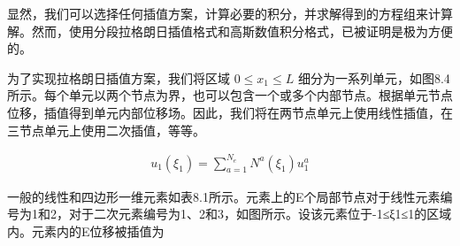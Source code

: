 \documentclass[12pt,a4paper]{book}
\begin{document}
显然，我们可以选择任何插值方案，计算必要的积分，并求解得到的方程组来计算解。然而，使用分段拉格朗日插值格式和高斯数值积分格式，已被证明是极为方便的。








为了实现拉格朗日插值方案，我们将区域 $ 0 \leq  x_1 \leq L $ 细分为一系列单元，如图8.4所示。每个单元以两个节点为界，也可以包含一个或多个内部节点。根据单元节点位移，插值得到单元内部位移场。因此，我们将在两节点单元上使用线性插值，在三节点单元上使用二次插值，等等。

\begin{equation*}
    \begin{aligned}
        u_{1}\left(\xi_{1}\right)=\sum_{a=1}^{N_{e}} N^{a}\left(\xi_{1}\right) u_{1}^{a}
    \end{aligned}
\end{equation*}


一般的线性和四边形一维元素如表8.1所示。元素上的E个局部节点对于线性元素编号为1和2，对于二次元素编号为1、2和3，如图所示。设该元素位于-1≤ξ1≤1的区域内。元素内的E位移被插值为


% 







\end{document}
